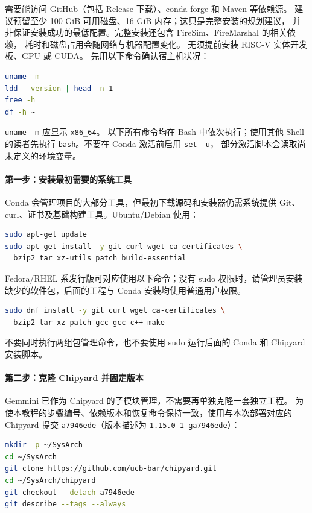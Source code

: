 需要能访问 GitHub（包括 Release 下载）、conda-forge 和 Maven 等依赖源。
建议预留至少 100 GiB 可用磁盘、16 GiB 内存；这只是完整安装的规划建议，
并非保证安装成功的最低配置。完整安装还包含 FireSim、FireMarshal 的相关依赖，
耗时和磁盘占用会随网络与机器配置变化。
无须提前安装 RISC-V 实体开发板、GPU 或 CUDA。
先用以下命令确认宿主机状况：

\begin{lstlisting}[language=bash]
uname -m
ldd --version | head -n 1
free -h
df -h ~
\end{lstlisting}

\lstinline|uname -m| 应显示 \lstinline|x86_64|。
以下所有命令均在 Bash 中依次执行；使用其他 Shell 的读者先执行
\lstinline|bash|。不要在 Conda 激活前启用 \lstinline|set -u|，
部分激活脚本会读取尚未定义的环境变量。

\paragraph{第一步：安装最初需要的系统工具}
Conda 会管理项目的大部分工具，但最初下载源码和安装器仍需系统提供
Git、curl、证书及基础构建工具。Ubuntu/Debian 使用：

\begin{lstlisting}[language=bash]
sudo apt-get update
sudo apt-get install -y git curl wget ca-certificates \
  bzip2 tar xz-utils patch build-essential
\end{lstlisting}

Fedora/RHEL 系发行版可对应使用以下命令；没有 sudo 权限时，请管理员安装
缺少的软件包，后面的工程与 Conda 安装均使用普通用户权限。

\begin{lstlisting}[language=bash]
sudo dnf install -y git curl wget ca-certificates \
  bzip2 tar xz patch gcc gcc-c++ make
\end{lstlisting}

不要同时执行两组包管理命令，也不要使用 sudo 运行后面的 Conda 和
Chipyard 安装脚本。

\paragraph{第二步：克隆 Chipyard 并固定版本}
Gemmini 已作为 Chipyard 的子模块管理，不需要再单独克隆一套独立工程。
为使本教程的步骤编号、依赖版本和恢复命令保持一致，使用与本次部署对应的
Chipyard 提交 \texttt{a7946ede}（版本描述为
\texttt{1.15.0-1-ga7946ede}）：

\begin{lstlisting}[language=bash]
mkdir -p ~/SysArch
cd ~/SysArch
git clone https://github.com/ucb-bar/chipyard.git
cd ~/SysArch/chipyard
git checkout --detach a7946ede
git describe --tags --always
\end{lstlisting}

